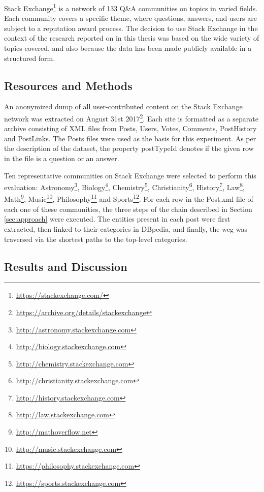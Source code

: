 Stack Exchange\footnote{\url{https://stackexchange.com/}}
is a network of 133 Q\&A communities on topics in varied fields. Each community covers a specific theme, where questions, answers, and users are subject to a reputation award process. The decision to use Stack Exchange in the context of the research reported on in this thesis was based on the wide variety of topics covered, and also because the data has been made publicly available in a structured form. 

\subsection{\hspace*{3pt} Resources and Methods}

An anonymized dump of all user-contributed content on the Stack Exchange network was extracted on August 31st 2017\footnote{\url{https://archive.org/details/stackexchange}}. Each site is formatted as a separate archive consisting of XML files from Posts, Users, Votes, Comments, PostHistory and PostLinks. The Posts files were used as the basis for this experiment. As per the description of the dataset, the property postTypeId denotes if the given row in the file is a question or an answer. 

Ten representative communities on Stack Exchange were selected to perform this evaluation:  Astronomy\footnote{\url{http://astronomy.stackexchange.com}},  Biology\footnote{\url{http://biology.stackexchange.com}}, Chemistry\footnote{\url{http://chemistry.stackexchange.com}}, Christianity\footnote{\url{http://christianity.stackexchange.com}}, History\footnote{\url{http://history.stackexchange.com}}, Law\footnote{\url{http://law.stackexchange.com}}, Math\footnote{\url{http://mathoverflow.net}}, Music\footnote{\url{http://music.stackexchange.com}}, Philosophy\footnote{\url{https://philosophy.stackexchange.com}} and Sports\footnote{\url{https://sports.stackexchange.com}}. For each row in the Post.xml file of each one of these communities,  the three steps of the chain described in Section \ref{sec:approach} were executed. The entities present in each post were first extracted, then linked to their categories in DBpedia, and finally, the \gls{wcg} was traversed via the shortest paths to the top-level categories. 

\subsection{\hspace*{3pt} Results and Discussion}

